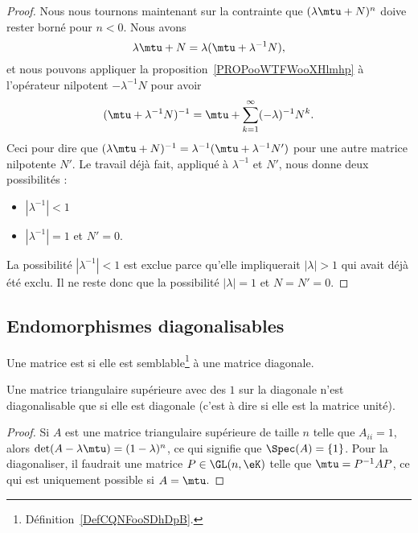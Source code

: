 \begin{proof}
    Nous nous tournons maintenant sur la contrainte que \( (\lambda\mtu+N)^n\) doive rester borné pour \( n<0\). Nous avons
    \begin{equation}
        \lambda\mtu+N=\lambda(\mtu+\lambda^{-1}N),
    \end{equation}
    et nous pouvons appliquer la proposition~\ref{PROPooWTFWooXHlmhp} à l'opérateur nilpotent \( -\lambda^{-1} N\) pour avoir
    \begin{equation}
        (\mtu+\lambda^{-1}N)^{-1}=\mtu+\sum_{k=1}^{\infty}(-\lambda)^{-1}N^k.
    \end{equation}
    Ceci pour dire que \( (\lambda\mtu+N)^{-1}=\lambda^{-1}(\mtu+\lambda^{-1}N')\) pour une autre matrice nilpotente \( N'\). Le travail déjà fait, appliqué à \( \lambda^{-1}\) et \( N'\), nous donne deux possibilités :
    \begin{itemize}
        \item \( | \lambda^{-1} |<1\)
        \item \( | \lambda^{-1} |=1\) et \( N'=0\).
    \end{itemize}
    La possibilité \( | \lambda^{-1} |<1\) est exclue parce qu'elle impliquerait \( | \lambda |>1\) qui avait déjà été exclu. Il ne reste donc que la possibilité \( | \lambda |=1\) et \( N=N'=0\).
\end{proof}

\subsection{Endomorphismes diagonalisables}

\begin{definition}  \label{DefCNJqsmo}
    Une matrice est  si elle est semblable\footnote{Définition~\ref{DefCQNFooSDhDpB}.} à une matrice diagonale.
\end{definition}

\begin{lemma}
    Une matrice triangulaire supérieure avec des \( 1\) sur la diagonale n'est diagonalisable que si elle est diagonale (c'est à dire si elle est la matrice unité).
\end{lemma}

\begin{proof}
    Si \( A\) est une matrice triangulaire supérieure de taille \( n\) telle que \( A_{ii}=1\), alors \( \det(A-\lambda\mtu)=(1-\lambda)^n\), ce qui signifie que \( \Spec(A)=\{ 1 \}\). Pour la diagonaliser, il faudrait une matrice \( P\in\GL(n,\eK)\) telle que \( \mtu=P^{-1}AP\), ce qui est uniquement possible si \( A=\mtu\).
\end{proof}

